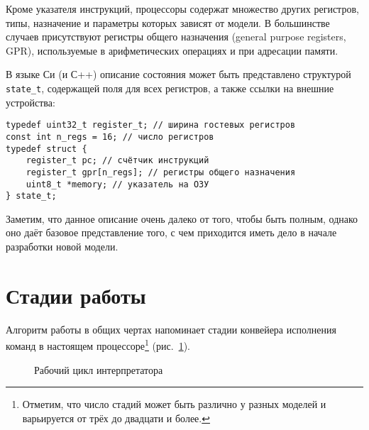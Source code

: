 Кроме указателя инструкций, процессоры содержат множество других регистров, типы, назначение и параметры которых зависят от модели. В большинстве случаев присутствуют регистры общего назначения (\abbr general purpose registers, GPR), используемые в арифметических операциях и при адресации памяти.

В языке Си (и С++) описание состояния может быть представлено структурой \texttt{state_t}, содержащей поля для всех регистров, а также ссылки на внешние устройства:

\begin{lstlisting}
typedef uint32_t register_t; // ширина гостевых регистров
const int n_regs = 16; // число регистров
typedef struct {
    register_t pc; // счётчик инструкций
    register_t gpr[n_regs]; // регистры общего назначения
    uint8_t *memory; // указатель на ОЗУ
} state_t;
\end{lstlisting}

Заметим, что данное описание очень далеко от того, чтобы быть полным, однако оно даёт базовое представление того, с чем приходится иметь дело в начале разработки новой модели.

\section{Стадии работы}
Алгоритм работы в общих чертах напоминает стадии конвейера исполнения команд в настоящем процессоре\footnote{Отметим, что число  стадий может быть различно у разных моделей и варьируется от трёх до двадцати и более.} (рис.~\ref{fig:interp-cycle-expanded}). 

\begin{figure}[htb]
    \centering
    \caption{Рабочий цикл интерпретатора}
    \label{fig:interp-cycle-expanded}
\end{figure}

